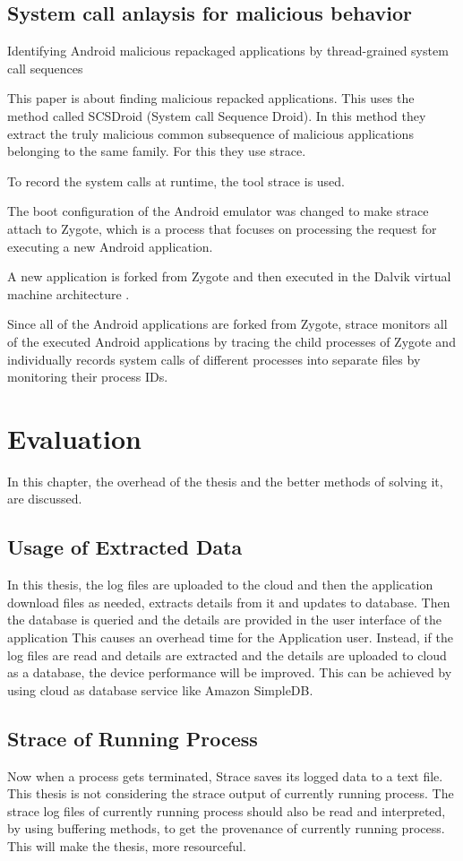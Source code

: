 \documentclass[12pt]{report}
\begin{document}
\section{System call anlaysis for malicious behavior}
Identifying Android malicious repackaged applications by thread-grained system call sequences\citep{lin2013identifying}

This paper is about finding malicious repacked applications. This uses the method called SCSDroid (System call Sequence Droid). In this method they extract the truly malicious common subsequence of malicious applications belonging to the same family. For this they use strace.

 
To record the system calls at runtime, the tool strace
is used.

The boot configuration of the Android emulator was changed to make strace attach to Zygote, which is a process that focuses on processing the request for executing a new Android application.

A new application is forked from Zygote and then executed in the Dalvik virtual machine architecture .

Since all of the Android applications are forked from Zygote, strace monitors all of the executed Android applications by tracing the child processes of Zygote and individually records system calls of different processes into separate files by monitoring their process IDs.

\chapter{Evaluation}
In this chapter, the overhead of the thesis and the better methods of solving it, are discussed.
\section{Usage of Extracted Data}
In this thesis, the log files are uploaded to the cloud and then the application download files as needed, extracts details from it and updates to database. Then the database is queried and the details are provided in the user interface of the application This causes an overhead time for the Application user. Instead, if the log files are read and details are extracted and the details  are uploaded to cloud as a database, the device performance will be improved. This can be achieved by using cloud as database service like Amazon SimpleDB.

\section{Strace of Running Process}
Now when a process gets terminated, Strace saves its logged data to a text file. This thesis is not considering the strace output of currently running process. The strace log files of currently running process should also be read and interpreted, by using buffering methods, to get the provenance of currently running process. This will make the thesis, more resourceful.
\end{document}
